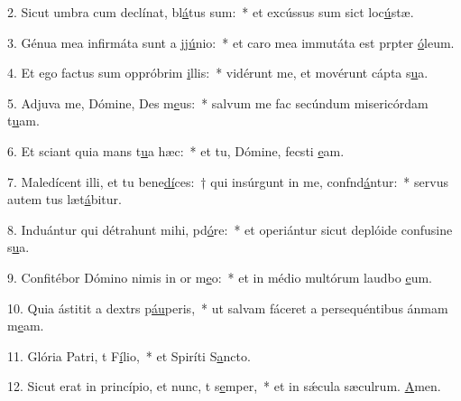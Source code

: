 2. Sicut umbra cum declínat, bl\uline{á}tus sum:~* et excússus sum sict loc\uline{ú}stæ.\par 
3. Génua mea infirmáta sunt a jj\uline{ú}nio:~* et caro mea immutáta est prpter \uline{ó}leum.\par 
4. Et ego factus sum oppróbrim \uline{i}llis:~* vidérunt me, et movérunt cápta s\uline{u}a.\par 
5. Adjuva me, Dómine, Des m\uline{e}us:~* salvum me fac secúndum misericórdam t\uline{u}am.\par 
6. Et sciant quia mans t\uline{u}a hæc:~* et tu, Dómine, fecsti \uline{e}am.\par 
7. Maledícent illi, et tu bene\uline{dí}ces:~† qui insúrgunt in me, confnd\uline{á}ntur:~* servus autem tus læt\uline{á}bitur.\par 
8. Induántur qui détrahunt mihi, pd\uline{ó}re:~* et operiántur sicut deplóide confusine s\uline{u}a.\par 
9. Confitébor Dómino nimis in or m\uline{e}o:~* et in médio multórum laudbo \uline{e}um.\par 
10. Quia ástitit a dextrs p\uline{áu}peris,~* ut salvam fáceret a persequéntibus ánmam m\uline{e}am.\par 
11. Glória Patri, t F\uline{í}lio,~* et Spiríti S\uline{a}ncto.\par 
12. Sicut erat in princípio, et nunc, t s\uline{e}mper,~* et in sǽcula sæculrum. \uline{A}men.\par 
